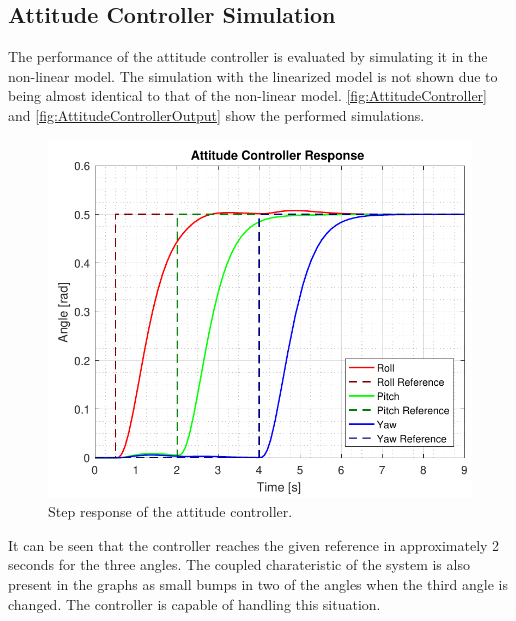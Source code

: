 \subsection{Attitude Controller Simulation}
The performance of the attitude controller is evaluated by simulating it in the non-linear model. The simulation with the linearized model is not shown due to being almost identical to that of the non-linear model. \autoref{fig:AttitudeController} and \ref{fig:AttitudeControllerOutput} show the performed simulations.
\begin{figure}[H]
	\centering
	\includegraphics[scale=0.65]{figures/simAttitudeControl}
	\caption{Step response of the attitude controller.}
	\label{fig:AttitudeController}
\end{figure}
It can be seen that the controller reaches the given reference in approximately 2 seconds for the three angles. The coupled charateristic of the system is also present in the graphs as small bumps in two of the angles when the third angle is changed. The controller is capable of handling this situation.

